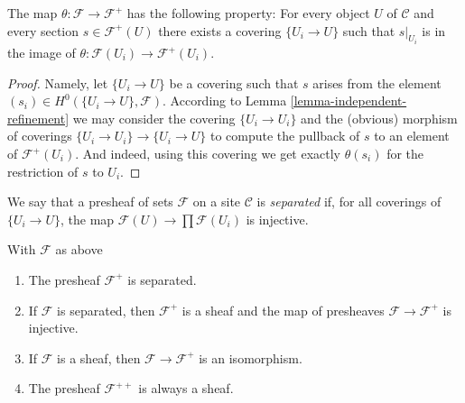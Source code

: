 \begin{lemma}
\label{lemma-plus-surjective}
The map $\theta : \mathcal{F} \to \mathcal{F}^+$ has the following
property: For every object $U$ of $\mathcal{C}$ and every section
$s \in \mathcal{F}^+(U)$ there exists a covering $\{U_i \to U\}$
such that $s|_{U_i}$ is in the image of $\theta : \mathcal{F}(U_i)
\to \mathcal{F}^{+}(U_i)$.
\end{lemma}

\begin{proof}
Namely, let $\{U_i \to U\}$ be a covering such that $s$ arises
from the element $(s_i) \in H^0(\{U_i \to U\}, \mathcal{F})$.
According to Lemma \ref{lemma-independent-refinement} we may
consider the covering $\{U_i \to U_i\}$ and the (obvious) morphism
of coverings $\{U_i \to U_i\} \to \{U_i \to U\}$ to compute the
pullback of $s$ to an element of $\mathcal{F}^+(U_i)$. And indeed,
using this covering we get exactly $\theta(s_i)$ for the restriction
of $s$ to $U_i$.
\end{proof}

\begin{definition}
\label{definition-separated}
We say that a presheaf of sets $\mathcal{F}$ on a site
$\mathcal{C}$ is {\it separated} if, for all coverings
of $\{U_i \rightarrow U\}$, the map
$\mathcal{F}(U) \to \prod \mathcal{F}(U_i)$ is injective.
\end{definition}

\begin{theorem}
\label{theorem-plus}
With $\mathcal{F}$ as above
\begin{enumerate}
\item
\label{item-sep}
The presheaf $\mathcal{F}^+$ is separated.
\item
\label{item-sheaf}
If $\mathcal{F}$ is separated, then $\mathcal{F}^+$ is a sheaf
and the map of presheaves $\mathcal{F} \to \mathcal{F}^+$ is injective.
\item
\label{item-plus-iso}
If $\mathcal{F}$ is a sheaf, then $\mathcal{F} \to \mathcal{F}^+$
is an isomorphism.
\item
\label{item-plusplus}
The presheaf $\mathcal{F}^{++}$ is always a sheaf.
\end{enumerate}
\end{theorem}

